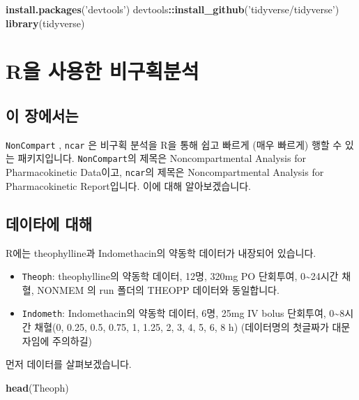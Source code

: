 \documentclass[]{krantz}
\makeatletter
\newenvironment{Shaded}{\begin{snugshade}}{\end{snugshade}}
\newcommand{\KeywordTok}[1]{\textcolor[rgb]{0.13,0.29,0.53}{\textbf{#1}}}
\newcommand{\StringTok}[1]{\textcolor[rgb]{0.31,0.60,0.02}{#1}}
\newcommand{\OperatorTok}[1]{\textcolor[rgb]{0.81,0.36,0.00}{\textbf{#1}}}
\newcommand{\NormalTok}[1]{#1}
\providecommand{\tightlist}{%
  \setlength{\itemsep}{0pt}\setlength{\parskip}{0pt}}
\newenvironment{kframe}{%
\medskip{}
\setlength{\fboxsep}{.8em}
 \def\at@end@of@kframe{}%
 \ifinner\ifhmode%
  \def\at@end@of@kframe{\end{minipage}}%
  \begin{minipage}{\columnwidth}%
 \fi\fi%
 \def\FrameCommand##1{\hskip\@totalleftmargin \hskip-\fboxsep
 \colorbox{shadecolor}{##1}\hskip-\fboxsep
     \hskip-\linewidth \hskip-\@totalleftmargin \hskip\columnwidth}%
 \MakeFramed {\advance\hsize-\width
   \@totalleftmargin\z@ \linewidth\hsize
   \@setminipage}}%
 {\par\unskip\endMakeFramed%
 \at@end@of@kframe}
\renewenvironment{Shaded}{\begin{kframe}}{\end{kframe}}
\theoremstyle{definition}
\theoremstyle{definition}
\theoremstyle{definition}
\theoremstyle{remark}
\makeatother
\begin{document}
\begin{Shaded}
\begin{Highlighting}[]
\KeywordTok{install.packages}\NormalTok{(}\StringTok{'devtools'}\NormalTok{)}
\NormalTok{devtools}\OperatorTok{::}\KeywordTok{install_github}\NormalTok{(}\StringTok{'tidyverse/tidyverse'}\NormalTok{)}
\KeywordTok{library}\NormalTok{(tidyverse)}
\end{Highlighting}
\end{Shaded}

\section{R을 사용한 비구획분석}\label{noncompart}

\subsection{이 장에서는}\label{summary-noncompart}

\texttt{NonCompart} \citep{R-NonCompart}, \texttt{ncar} \citep{R-ncar}
은 비구획 분석을 R을 통해 쉽고 빠르게 (매우 빠르게) 행할 수 있는
패키지입니다. \texttt{NonCompart}의 제목은 Noncompartmental Analysis for
Pharmacokinetic Data이고, \texttt{ncar}의 제목은 Noncompartmental
Analysis for Pharmacokinetic Report입니다. 이에 대해 알아보겠습니다.

\subsection{데이타에 대해}\label{TheophData}

R에는 theophylline과 Indomethacin의 약동학 데이터가 내장되어 있습니다.

\begin{itemize}
\tightlist
\item
  \texttt{Theoph}: theophylline의 약동학 데이터, 12명, 320mg PO
  단회투여, 0\textasciitilde{}24시간 채혈, NONMEM 의 run 폴더의 THEOPP
  데이터와 동일합니다.
\item
  \texttt{Indometh}: Indomethacin의 약동학 데이터, 6명, 25mg IV bolus
  단회투여, 0\textasciitilde{}8시간 채혈(0, 0.25, 0.5, 0.75, 1, 1.25, 2,
  3, 4, 5, 6, 8 h) (데이터명의 첫글짜가 대문자임에 주의하길)
\end{itemize}

먼저 데이터를 살펴보겠습니다.

\begin{Shaded}
\begin{Highlighting}[]
\KeywordTok{head}\NormalTok{(Theoph)}
\end{Highlighting}
\end{Shaded}
\end{document}

